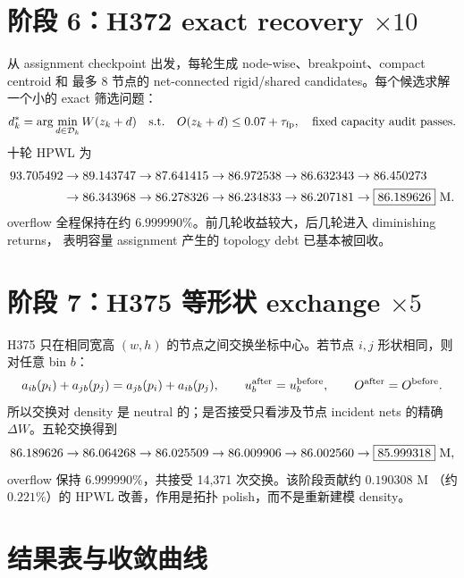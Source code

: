 \documentclass[UTF8,11pt,a4paper]{ctexart}
\begin{document}
\section{阶段 6：H372 exact recovery \texorpdfstring{$\times10$}{x10}}

从 assignment checkpoint 出发，每轮生成 node-wise、breakpoint、compact centroid 和
最多 8 节点的 net-connected rigid/shared candidates。每个候选求解一个小的 exact
筛选问题：
\begin{equation}
 d_k^*=\arg\min_{d\in\mathcal{D}_k} W(z_k+d)
 \quad\text{s.t.}\quad O(z_k+d)\le0.07+\tau_{\rm fp},
 \quad \text{fixed capacity audit passes}.
 \label{eq:recoveryoracle}
\end{equation}
十轮 HPWL 为
\begin{align}
 93.705492&\rightarrow89.143747\rightarrow87.641415\rightarrow86.972538
 \rightarrow86.632343\rightarrow86.450273\\
 &\rightarrow86.343968\rightarrow86.278326\rightarrow86.234833
 \rightarrow86.207181\rightarrow\boxed{86.189626}\ {\rm M}.
 \label{eq:recoveryresult}
\end{align}
overflow 全程保持在约 $6.999990\%$。前几轮收益较大，后几轮进入 diminishing returns，
表明容量 assignment 产生的 topology debt 已基本被回收。

\section{阶段 7：H375 等形状 exchange \texorpdfstring{$\times5$}{x5}}

H375 只在相同宽高 $(w,h)$ 的节点之间交换坐标中心。若节点 $i,j$ 形状相同，则对任意
bin $b$：
\begin{equation}
 a_{ib}(p_i)+a_{jb}(p_j)=a_{jb}(p_i)+a_{ib}(p_j),
 \qquad u_b^{\rm after}=u_b^{\rm before},
 \qquad O^{\rm after}=O^{\rm before}.
 \label{eq:swap}
\end{equation}
所以交换对 density 是 neutral 的；是否接受只看涉及节点 incident nets 的精确
$\Delta W$。五轮交换得到
\begin{equation}
 86.189626\rightarrow86.064268\rightarrow86.025509\rightarrow86.009906
 \rightarrow86.002560\rightarrow\boxed{85.999318}\ {\rm M},
 \label{eq:swapresult}
\end{equation}
overflow 保持 $6.999990\%$，共接受 14,371 次交换。该阶段贡献约 $0.190308$ M
（约 $0.221\%$）的 HPWL 改善，作用是拓扑 polish，而不是重新建模 density。

\section{结果表与收敛曲线}
\end{document}
